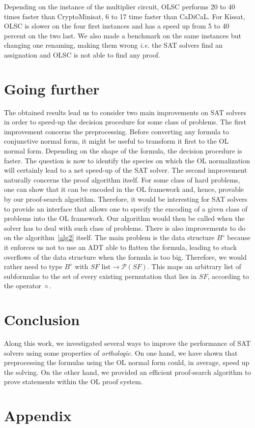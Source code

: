 \documentclass[a4paper, 11pt]{article}
\newcommand{\ie}{ \textit{i.e.} }
\begin{document}
    Depending on the instance of the multiplier circuit, OLSC
    performs 20 to 40 times faster than CryptoMinisat, 6 to 17 time faster than CaDiCaL. For Kissat,
    OLSC is slower on the four first instances and has a speed up from 5 to 40 percent on the two last.
    We also made a benchmark on the same instances but changing one renaming, making them wrong \ie
    the SAT solvers find an assignation and OLSC is not able to find any proof.

    \section{Going further}
    The obtained results lead us to consider two main improvements on SAT solvers in order to speed-up 
    the decision procedure for some class of problems. 
    The first improvement concerns the preprocessing. Before converting any formula to
    conjunctive normal form, it might be useful to transform it first to the OL normal form. Depending
    on the shape of the formula, the decision procedure is faster. The question is now to identify the
    species on which the OL normalization will certainly lead to a net speed-up of the SAT solver. 
    The second improvement naturally 
    concerns the proof algorithm itself. For some class of hard problems, one can show that it can be
    encoded in the OL framework and, hence, provable by our proof-search algorithm. Therefore, it
    would be interesting for SAT solvers to provide an interface that allows one to specify the
    encoding of a given class of problems into the OL framework. Our algorithm would then be called
    when the solver has to deal with such class of problems. There is also improvements to do on the
    algorithm~\ref{alg2} itself. The main problem is the data structure $B^\diamond$ because it enforces
    us not to use an ADT able to flatten the formula, leading to stack overflows of the data structure
    when the formula is too big. Therefore, we would rather need to type $B^\diamond$ with 
    $SF\text{ list}\rightarrow\mathcal{P}(SF)$. This maps an arbitrary list of subformulas to
    the set of every existing permutation that lies in $SF$, according to the operator $\diamond$.
    \section{Conclusion} 
    Along this work, we investigated several ways to improve the performance of SAT solvers using
    some properties of \textit{orthologic}. On one hand, we have shown that preprocessing the formulas 
    using the OL normal form could, in average, speed up the solving. On the other hand, we provided an
    efficient proof-search algorithm to prove statements within the OL proof system.
    \section{Appendix}
    
    
\end{document}
